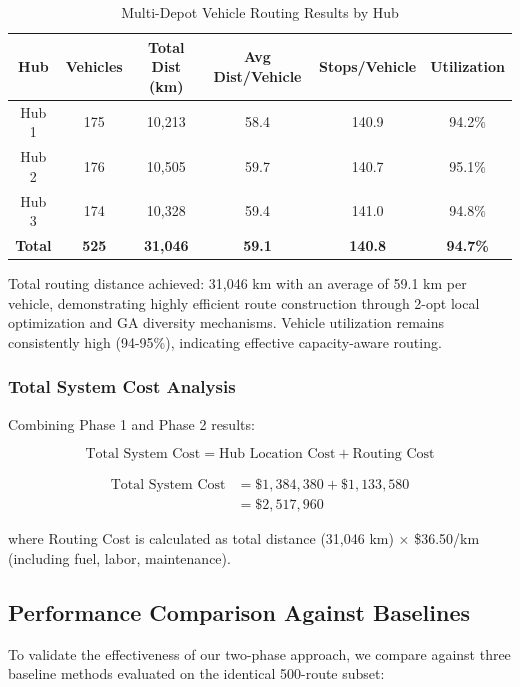 \documentclass[conference]{IEEEtran}
\begin{document}
\begin{table}[htbp]
\caption{Multi-Depot Vehicle Routing Results by Hub}
\label{tab:routing-results}
\centering
\renewcommand{\arraystretch}{1.3}
\begin{tabular}{|c|c|c|c|c|c|}
\hline
\textbf{Hub} & \textbf{Vehicles} & \textbf{Total Dist (km)} & \textbf{Avg Dist/Vehicle} & \textbf{Stops/Vehicle} & \textbf{Utilization} \\
\hline
Hub 1 & 175 & 10,213 & 58.4 & 140.9 & 94.2\% \\
\hline
Hub 2 & 176 & 10,505 & 59.7 & 140.7 & 95.1\% \\
\hline
Hub 3 & 174 & 10,328 & 59.4 & 141.0 & 94.8\% \\
\hline
\textbf{Total} & \textbf{525} & \textbf{31,046} & \textbf{59.1} & \textbf{140.8} & \textbf{94.7\%} \\
\hline
\end{tabular}
\end{table}

Total routing distance achieved: 31,046 km with an average of 59.1 km per vehicle, demonstrating highly efficient route construction through 2-opt local optimization and GA diversity mechanisms. Vehicle utilization remains consistently high (94-95\%), indicating effective capacity-aware routing.

\subsubsection{Total System Cost Analysis}

Combining Phase 1 and Phase 2 results:

\begin{equation}
\text{Total System Cost} = \text{Hub Location Cost} + \text{Routing Cost}
\end{equation}

\begin{align}
\text{Total System Cost} &= \$1,384,380 + \$1,133,580 \\
&= \$2,517,960
\end{align}

where Routing Cost is calculated as total distance (31,046 km) $\times$ \$36.50/km (including fuel, labor, maintenance).

\subsection{Performance Comparison Against Baselines}

To validate the effectiveness of our two-phase approach, we compare against three baseline methods evaluated on the identical 500-route subset:
\end{document}
